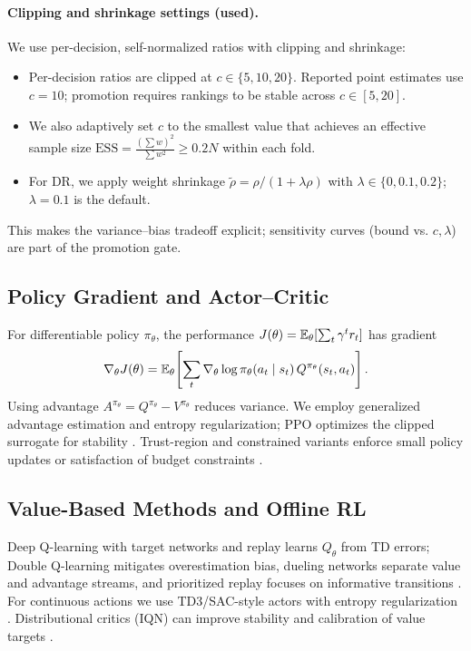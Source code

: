 \paragraph{Clipping and shrinkage settings (used).} We use per-decision, self-normalized ratios with clipping and shrinkage:
\begin{itemize}
  \item Per-decision ratios are clipped at $c\in\{5,10,20\}$. Reported point estimates use $c=10$; promotion requires rankings to be stable across $c\in[5,20]$.
  \item We also adaptively set $c$ to the smallest value that achieves an effective sample size $\mathrm{ESS}=\tfrac{(\sum w)^2}{\sum w^2}\ge 0.2N$ within each fold.
  \item For DR, we apply weight shrinkage $\tilde \rho=\rho/(1+\lambda\rho)$ with $\lambda\in\{0,0.1,0.2\}$; $\lambda=0.1$ is the default.
\end{itemize}
This makes the variance–bias tradeoff explicit; sensitivity curves (bound vs. $c,\lambda$) are part of the promotion gate.

\subsection{Policy Gradient and Actor--Critic}\label{subsec:pgt}
For differentiable policy $\pi_\theta$, the performance $J(\theta)=\mathbb{E}_\theta[\sum_t \gamma^t r_t]$
has gradient
\[
\nabla_\theta J(\theta) = \mathbb{E}_\theta\!\left[\sum_t \nabla_\theta \log \pi_\theta(a_t\mid s_t)\,Q^{\pi_\theta}(s_t,a_t)\right].
\]
Using advantage $A^{\pi_\theta}=Q^{\pi_\theta}-V^{\pi_\theta}$ reduces variance. We employ generalized advantage estimation and entropy regularization; PPO optimizes the clipped surrogate for stability \citep{schulman2016gae,schulman2017ppo}. Trust-region and constrained variants enforce small policy updates or satisfaction of budget constraints \citep{schulman2015trpo,achiam2017cpo}.

\subsection{Value-Based Methods and Offline RL}\label{subsec:cql}
Deep Q-learning with target networks and replay learns $Q_\theta$ from TD errors; Double Q-learning mitigates overestimation bias, dueling networks separate value and advantage streams, and prioritized replay focuses on informative transitions \citep{vanhasselt2016,wang2016dueling,schaul2016per}. For continuous actions we use TD3/SAC-style actors with entropy regularization \citep{fujimoto2018td3,haarnoja2018sac}. Distributional critics (IQN) can improve stability and calibration of value targets \citep{bellemare2017distributional,dabney2018quantile}.

